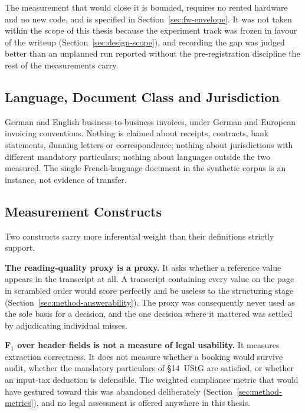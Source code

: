 The measurement that would close it is bounded, requires no rented hardware and no new code,
and is specified in Section~\ref{sec:fw-envelope}. It was not taken within the scope of this thesis
because the experiment track was frozen in favour of the writeup
(Section~\ref{sec:design-scope}), and recording the gap was judged better than an unplanned run
reported without the pre-registration discipline the rest of the measurements carry.

\subsection{Language, Document Class and Jurisdiction}
\label{sec:lim-scope}

German and English business-to-business invoices, under German and European invoicing
conventions. Nothing is claimed about receipts, contracts, bank statements, dunning letters or
correspondence; nothing about jurisdictions with different mandatory particulars; nothing about
languages outside the two measured. The single French-language document in the synthetic corpus is
an instance, not evidence of transfer.

\subsection{Measurement Constructs}
\label{sec:lim-measurement}

Two constructs carry more inferential weight than their definitions strictly support.

\textbf{The reading-quality proxy is a proxy.} It asks whether a reference value appears in the
transcript at all. A transcript containing every value on the page in scrambled order would score
perfectly and be useless to the structuring stage (Section~\ref{sec:method-answerability}). The proxy
was consequently never used as the sole basis for a decision, and the one decision where it
mattered was settled by adjudicating individual misses.

\textbf{F$_1$ over header fields is not a measure of legal usability.} It measures extraction
correctness. It does not measure whether a booking would survive audit, whether the mandatory
particulars of \S14~\ac{UStG} are satisfied, or whether an input-tax deduction is defensible. The
weighted compliance metric that would have gestured toward this was abandoned deliberately
(Section~\ref{sec:method-metrics}), and no legal assessment is offered anywhere in this thesis.

